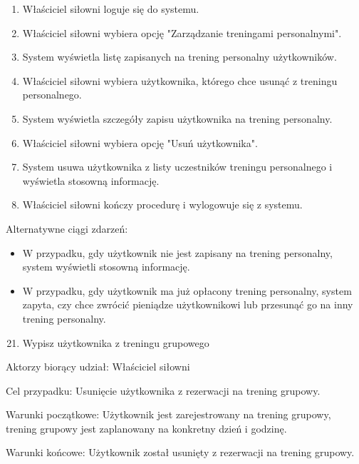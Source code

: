 \documentclass[
]{article}
\providecommand{\tightlist}{%
  \setlength{\itemsep}{0pt}\setlength{\parskip}{0pt}}
\begin{document}
\begin{enumerate}
\tightlist
\item
  {Właściciel siłowni loguje się do systemu.}
\item
  {Właściciel siłowni wybiera opcję "Zarządzanie treningami
  personalnymi".}
\item
  {System wyświetla listę zapisanych na trening personalny
  użytkowników.}
\item
  {Właściciel siłowni wybiera użytkownika, którego chce usunąć z
  treningu personalnego.}
\item
  {System wyświetla szczegóły zapisu użytkownika na trening personalny.}
\item
  {Właściciel siłowni wybiera opcję "Usuń użytkownika".}
\item
  {System usuwa użytkownika z listy uczestników treningu personalnego i
  wyświetla stosowną informację.}
\item
  {Właściciel siłowni kończy procedurę i wylogowuje się z systemu.}
\end{enumerate}

{Alternatywne ciągi zdarzeń:}

\begin{itemize}
\tightlist
\item
  {W przypadku, gdy użytkownik nie jest zapisany na trening personalny,
  system wyświetli stosowną informację.}
\item
  {W przypadku, gdy użytkownik ma już opłacony trening personalny,
  system zapyta, czy chce zwrócić pieniądze użytkownikowi lub przesunąć
  go na inny trening personalny.}
\end{itemize}

{}

{}

\begin{enumerate}
\setcounter{enumi}{20}
\tightlist
\item
  {Wypisz użytkownika z treningu grupowego}
\end{enumerate}

{Aktorzy biorący udział: Właściciel siłowni}

{Cel przypadku: Usunięcie użytkownika z rezerwacji na trening grupowy.}

{Warunki początkowe: Użytkownik jest zarejestrowany na trening grupowy,
trening grupowy jest zaplanowany na konkretny dzień i godzinę.}

{Warunki końcowe: Użytkownik został usunięty z rezerwacji na trening
grupowy.}
\end{document}
